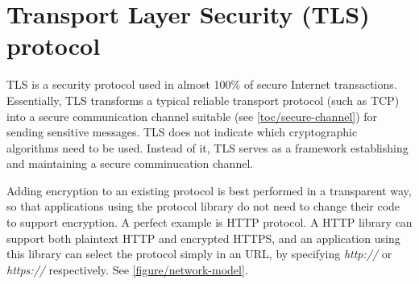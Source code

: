 \chapter{Transport Layer Security (TLS) protocol}



TLS is a security protocol used in almost 100\% of secure Internet transactions. Essentially, TLS transforms a typical reliable transport protocol (such as TCP) into a secure communication channel suitable (see \autoref{toc/secure-channel}) for sending sensitive messages. TLS does not indicate which cryptographic algorithms need to be used. Instead of it, TLS serves as a framework establishing and maintaining a secure comminucation channel.

Adding encryption to an existing protocol is best performed in a transparent way, so that applications using the protocol library do not need to change their code to support encryption. A perfect example is HTTP protocol. A HTTP library can support both plaintext HTTP and encrypted HTTPS, and an application using this library can select the protocol simply in an URL, by specifying \textit{http://} or \textit{https://} respectively. See \autoref{figure/network-model}.







